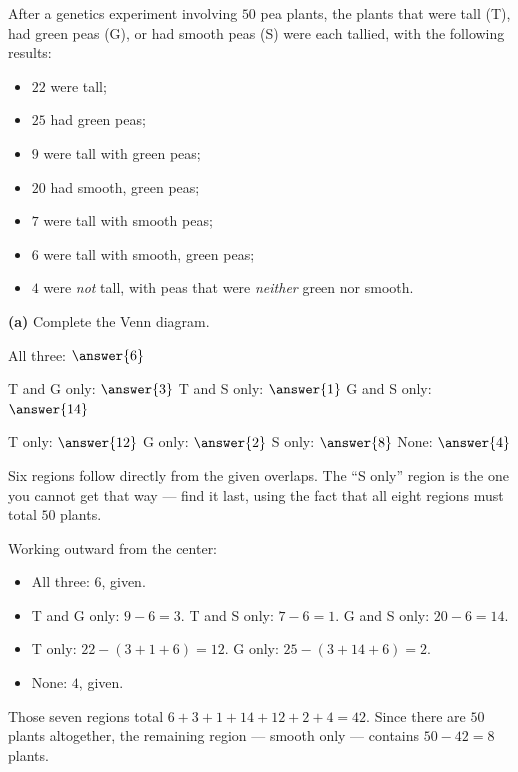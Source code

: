 \documentclass[12pt]{ximera}
\begin{document}
\begin{problem}
After a genetics experiment involving $50$ pea plants, the plants that were tall
(T), had green peas (G), or had smooth peas (S) were each tallied, with the
following results:
\begin{itemize}
    \item $22$ were tall;
    \item $25$ had green peas;
    \item $9$ were tall with green peas;
    \item $20$ had smooth, green peas;
    \item $7$ were tall with smooth peas;
    \item $6$ were tall with smooth, green peas;
    \item $4$ were \emph{not} tall, with peas that were \emph{neither} green nor smooth.
\end{itemize}

\begin{prompt}
\textbf{(a)} Complete the Venn diagram.

\begin{center}
\end{center}

All three: $\answer{6}$

\smallskip
T and G only: $\answer{3}$ \qquad
T and S only: $\answer{1}$ \qquad
G and S only: $\answer{14}$

\smallskip
T only: $\answer{12}$ \qquad
G only: $\answer{2}$ \qquad
S only: $\answer{8}$ \qquad
None: $\answer{4}$

\begin{hint}
Six regions follow directly from the given overlaps. The ``S only'' region is the one
you cannot get that way --- find it last, using the fact that all eight regions must
total $50$ plants.
\end{hint}

\begin{feedback}
Working outward from the center:
\begin{itemize}
\item All three: $6$, given.
\item T and G only: $9-6=3$. \quad T and S only: $7-6=1$. \quad
      G and S only: $20-6=14$.
\item T only: $22-(3+1+6)=12$. \quad G only: $25-(3+14+6)=2$.
\item None: $4$, given.
\end{itemize}
Those seven regions total $6+3+1+14+12+2+4=42$. Since there are $50$ plants
altogether, the remaining region --- smooth only --- contains $50-42=8$ plants.


\end{feedback}
\end{prompt}
\end{problem}
\end{document}
